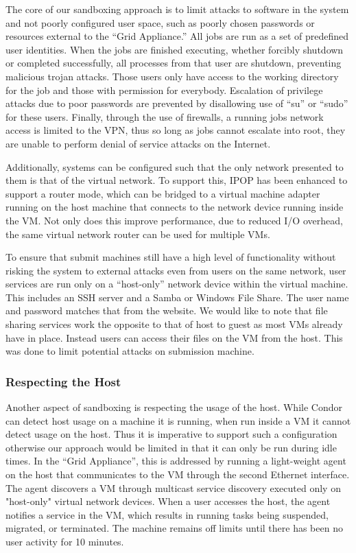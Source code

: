 \documentclass[twocolumn]{svjour3}
\begin{document}
The core of our sandboxing approach is to limit attacks to software in the
system and not poorly configured user space, such as poorly chosen passwords or
resources external to the ``Grid Appliance.''  All jobs are run as a set of
predefined user identities.  When the jobs are finished executing, whether
forcibly shutdown or completed successfully, all processes from that user are
shutdown, preventing malicious trojan attacks.  Those users only have access to
the working directory for the job and those with permission for everybody.
Escalation of privilege attacks due to poor passwords are prevented by
disallowing use of ``su'' or ``sudo'' for these users.  Finally, through the
use of firewalls, a running jobs network access is limited to the VPN, thus so
long as jobs cannot escalate into root, they are unable to perform denial of
service attacks on the Internet.

Additionally, systems can be configured such that the only network presented to
them is that of the virtual network.  To support this, IPOP has been enhanced to
support a router mode, which can be bridged to a virtual machine adapter
running on the host machine that connects to the network device running inside
the VM.  Not only does this improve performance, due to reduced I/O overhead,
the same virtual network router can be used for multiple VMs.

To ensure that submit machines still have a high level of functionality without
risking the system to external attacks even from users on the same network,
user services are run only on a ``host-only'' network device within the virtual
machine.  This includes an SSH server and a Samba or Windows File Share.  The
user name and password matches that from the website.  We would like to note
that file sharing services work the opposite to that of host to guest as most
VMs already have in place.  Instead users can access their files on the VM from
the host.  This was done to limit potential attacks on submission machine.

\subsubsection{Respecting the Host}

Another aspect of sandboxing is respecting the usage of the host.  While Condor
can detect host usage on a machine it is running, when run inside a VM it
cannot detect usage on the host.  Thus it is imperative to support such a
configuration otherwise our approach would be limited in that it can only be
run during idle times.  In the ``Grid Appliance'', this is addressed by running
a light-weight agent on the host that communicates to the VM through the second
Ethernet interface.  The agent discovers a VM through multicast service
discovery executed only on "host-only" virtual network devices.  When a user
accesses the host, the agent notifies a service in the VM, which results in
running tasks being suspended, migrated, or terminated.  The machine remains
off limits until there has been no user activity for 10 minutes.
\end{document}

